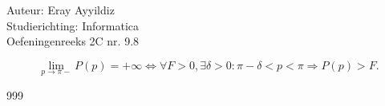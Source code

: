 \documentclass[a4paper]{article}
\begin{document}
  
\noindent \large Auteur: Eray Ayyildiz \\ 
\noindent \large Studierichting: Informatica \\ 
\noindent \large Oefeningenreeks 2C nr. 9.8 \\

\medskip

\normalsize

$$
\lim\limits_{p \to \pi-} P(p) = +\infty \Leftrightarrow \forall F > 0, \exists \delta > 0 : \pi - \delta < p < \pi \Rightarrow P(p) > F.
$$




\begin{thebibliography}{999}
\end{thebibliography}
\end{document}
